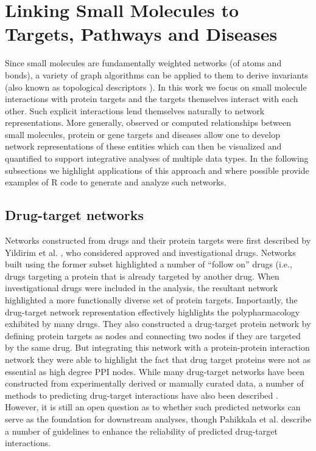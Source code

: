 \documentclass[]{book}
\begin{document}
\section{Linking Small Molecules to Targets, Pathways and Diseases}
\label{sec:link-small-molec}

Since small molecules are fundamentally weighted networks (of atoms
and bonds), a variety of graph algorithms can be applied to them to
derive invariants (also known as topological descriptors
\cite{Guha:2012vn}). In this work we focus on small molecule
interactions with protein targets and the targets themselves interact
with each other. Such explicit interactions lend themselves naturally
to network representations. More generally, observed or computed
relationships between small molecules, protein or gene targets and
diseases allow one to develop network representations of these
entities which can then be visualized and quantified to support
integrative analyses of multiple data types. In the following
subsections we highlight applications of this approach and where
possible provide examples of R code to generate and analyze such
networks.

\subsection{Drug-target networks}
\label{sec:drug-target-networks}

Networks constructed from drugs and their protein targets were first
described by Yildirim et al. \cite{Yildirim:2007aa}, who considered
approved and investigational drugs. Networks built using the former
subset highlighted a number of ``follow on'' drugs (i.e., drugs
targeting a protein that is already targeted by another drug. When
investigational drugs were included in the analysis, the resultant
network highlighted a more functionally diverse set of protein
targets. Importantly, the drug-target network representation
effectively highlights the polypharmacology exhibited by many
drugs. They also constructed a drug-target protein network by defining
protein targets as nodes and connecting two nodes if they are targeted
by the same drug. But integrating this network with a protein-protein
interaction network they were able to highlight the fact that drug
target proteins were not as essential \cite{Jeong:2001gd} as high
degree PPI nodes. While many drug-target networks have been
constructed from experimentally derived or manually curated data, a
number of methods to predicting drug-target interactions have also
been described
\cite{Alaimo:2013ev,Wang:2013mw,Heiskanen:2013rc}. However, it is
still an open question as to whether such predicted networks can serve
as the foundation for downstream analyses, though Pahikkala et al. 
\cite{Pahikkala:2014gt} describe a number of guidelines to enhance the
reliability of predicted drug-target interactions.
\end{document}
